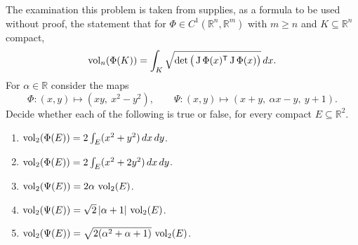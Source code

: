 \begin{exercise}
\label{ex:area_formula_two_maps}
The examination this problem is taken from supplies, as a formula to be used without proof, the
statement that for $\Phi \in C^1(\mathbb{R}^n,\mathbb{R}^m)$ with $m \geq n$ and $K \subseteq
\mathbb{R}^n$ compact,
\begin{equation}
\label{eq:mock_area_formula}
  \operatorname{vol}_n(\Phi(K)) = \int_K \sqrt{\det\big(\operatorname{J}\Phi(x)^{\mathsf{T}} \operatorname{J}\Phi(x)\big)}\,dx .
\end{equation}
For $\alpha \in \mathbb{R}$ consider the maps
\[\Phi : (x,y) \mapsto (xy,\ x^2-y^2), \qquad
  \Psi : (x,y) \mapsto (x+y,\ \alpha x - y,\ y+1).\]
Decide whether each of the following is true or false, for every compact $E \subseteq
\mathbb{R}^2$.
\begin{enumerate}[label=\textbf{(\alph*)}]
  \item $\operatorname{vol}_2(\Phi(E)) = 2\int_E (x^2+y^2)\,dx\,dy$.
  \item $\operatorname{vol}_2(\Phi(E)) = 2\int_E (x^2+2y^2)\,dx\,dy$.
  \item $\operatorname{vol}_2(\Psi(E)) = 2\alpha\,\operatorname{vol}_2(E)$.
  \item $\operatorname{vol}_2(\Psi(E)) = \sqrt{2}\,\lvert\alpha+1\rvert\,\operatorname{vol}_2(E)$.
  \item $\operatorname{vol}_2(\Psi(E)) = \sqrt{2(\alpha^2+\alpha+1)}\,\operatorname{vol}_2(E)$.
\end{enumerate}
\end{exercise}



